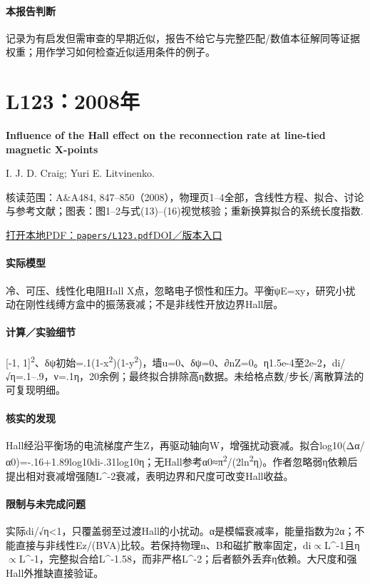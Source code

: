 \paragraph{本报告判断}记录为有启发但需审查的早期近似，报告不给它与完整匹配/数值本征解同等证据权重；用作学习如何检查近似适用条件的例子。

\section{L123：2008年}\label{paper:L123}

\textbf{Influence of the Hall effect on the reconnection rate at line-tied magnetic X-points}\citep{L123}\

I. J. D. Craig;  Yuri E. Litvinenko.

\textsf{核读范围：}A\&A484, 847–850（2008），物理页1–4全部，含线性方程、拟合、讨论与参考文献；\textsf{图表：}图1–2与式(13)–(16)视觉核验；重新换算拟合的系统长度指数.

\href{run:papers/L123.pdf}{打开本地PDF：\texttt{papers/L123.pdf}}\quad\href{https://doi.org/10.1051/0004-6361:200809569}{DOI／版本入口}

\paragraph{实际模型}冷、可压、线性化电阻Hall X点，忽略电子惯性和压力。平衡ψE=xy，研究小扰动在刚性线缚方盒中的振荡衰减；不是非线性开放边界Hall层。

\paragraph{计算／实验细节}[-1, 1]\textsuperscript{2}、δψ初始=.1(1-x\textsuperscript{2})(1-y\textsuperscript{2})，墙u=0、δψ=0、∂nZ=0。η1.5e-4至2e-2，di/√η=.1–.9，ν=.1η，20余例；最终拟合排除高η数据。未给格点数/步长/离散算法的可复现明细。

\paragraph{核实的发现}Hall经沿平衡场的电流梯度产生Z，再驱动轴向W，增强扰动衰减。拟合log10(Δα/α0)=-.16+1.89log10di-.31log10η；无Hall参考α0≈π\textsuperscript{2}/(2ln\textsuperscript{2}η)。作者忽略弱η依赖后提出相对衰减增强随L\textasciicircum{}-2衰减，表明边界和尺度可改变Hall收益。

\paragraph{限制与未完成问题}实际di/√η<1，只覆盖弱至过渡Hall的小扰动。α是模幅衰减率，能量指数为2α；不能直接与非线性Ez/(BVA)比较。若保持物理n、B和磁扩散率固定，di\ensuremath{\propto}L\textasciicircum{}-1且η\ensuremath{\propto}L\textasciicircum{}-1，完整拟合给L\textasciicircum{}-1.58，而非严格L\textasciicircum{}-2；后者额外丢弃η依赖。大尺度和强Hall外推缺直接验证。

